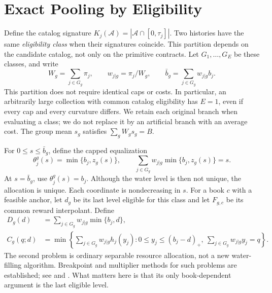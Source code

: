 \section{Exact Pooling by Eligibility}\label{sec:r49-pooling}
Define the catalog signature $K_j(\mathcal A)=|\mathcal A\cap[0,\tau_j]|$. Two histories have the same \emph{eligibility class} when their signatures coincide. This partition depends on the candidate catalog, not only on the primitive contracts. Let $G_1,\ldots,G_E$ be these classes, and write
\[
 W_g=\sum_{j\in G_g}\pi_j,\qquad
 w_{j|g}=\pi_j/W_g,\qquad
 \bar b_g=\sum_{j\in G_g}w_{j|g}b_j.
\]
This partition does not require identical caps or costs. In particular, an arbitrarily large collection with common catalog eligibility has $E=1$, even if every cap and every curvature differs. We retain each original branch when evaluating a class; we do not replace it by an artificial branch with an average cost. The group mean $s_g$ satisfies $\sum_gW_gs_g=B$.

For $0\leq s\leq\bar b_g$, define the capped equalization
\begin{equation}\label{eq:r49-theta}
 \theta_j^g(s)=\min\{b_j,z_g(s)\},\qquad
 \sum_{j\in G_g}w_{j|g}\min\{b_j,z_g(s)\}=s.
\end{equation}
At $s=\bar b_g$, use $\theta_j^g(s)=b_j$. Although the water level is then not unique, the allocation is unique. Each coordinate is nondecreasing in $s$. For a book $c$ with a feasible anchor, let $d_g$ be its last level eligible for this class and let $F_{g,c}$ be its common reward interpolant. Define
\begin{align}
 D_g(d)&=\sum_{j\in G_g}w_{j|g}\min\{b_j,d\},\label{eq:r49-D}\\
 C_g(q;d)&=\min\left\{\sum_{j\in G_g}w_{j|g}h_j(y_j):
 0\leq y_j\leq(b_j-d)_+,\ \sum_{j\in G_g}w_{j|g}y_j=q\right\}.
 \label{eq:r49-C}
\end{align}
The second problem is ordinary separable resource allocation, not a new water-filling algorithm. Breakpoint and multiplier methods for such problems are established; see \citet{PatrikssonStromberg2015} and \citet{SchootUiterkamp2022}. What matters here is that its only book-dependent argument is the last eligible level.


